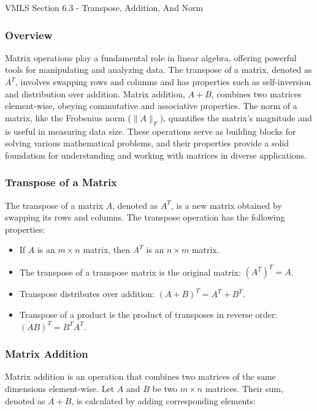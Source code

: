 \begin{notes}{VMLS Section 6.3 - Transpose, Addition, And Norm}
    \subsubsection*{Overview}

    Matrix operations play a fundamental role in linear algebra, offering powerful tools for manipulating and analyzing data. The transpose of a matrix, denoted as \(A^T\), involves swapping rows and 
    columns and has properties such as self-inversion and distribution over addition. Matrix addition, \(A + B\), combines two matrices element-wise, obeying commutative and associative properties. 
    The norm of a matrix, like the Frobenius norm (\(\|A\|_F\)), quantifies the matrix's magnitude and is useful in measuring data size. These operations serve as building blocks for solving various 
    mathematical problems, and their properties provide a solid foundation for understanding and working with matrices in diverse applications.

    \subsubsection*{Transpose of a Matrix}

    The transpose of a matrix $A$, denoted as $A^T$, is a new matrix obtained by swapping its rows and columns. The transpose operation has the following properties:
    
    \begin{itemize}
        \item If $A$ is an $m \times n$ matrix, then $A^T$ is an $n \times m$ matrix.
        \item The transpose of a transpose matrix is the original matrix: $(A^T)^T = A$.
        \item Transpose distributes over addition: $(A + B)^T = A^T + B^T$.
        \item Transpose of a product is the product of transposes in reverse order: $(AB)^T = B^TA^T$.
    \end{itemize}
    
    \subsubsection*{Matrix Addition}
    
    Matrix addition is an operation that combines two matrices of the same dimensions element-wise. Let $A$ and $B$ be two $m \times n$ matrices. Their sum, denoted as $A + B$, is calculated by adding 
    corresponding elements:
    

\end{notes}
